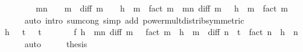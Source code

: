 \begin{isabellebody}
\ \ \isamarkupfalse%
\isanewline
\ \ \ \ \isamarkupfalse%
\ {\isachardoublequoteopen}{\isacharparenleft}{\kern0pt}{\isasymSum}m{\isacharless}{\kern0pt}n{\isachardot}{\kern0pt}\ {\isacharparenleft}{\kern0pt}{\isacharminus}{\kern0pt}\ {}{\isacharparenright}{\kern0pt}\ {\isacharcircum}{\kern0pt}\ m\ {\isacharasterisk}{\kern0pt}\ diff\ m\ {}\ {\isacharasterisk}{\kern0pt}\ {\isacharparenleft}{\kern0pt}{\isacharminus}{\kern0pt}\ h{\isacharparenright}{\kern0pt}\ {\isacharcircum}{\kern0pt}\ m\ {\isacharslash}{\kern0pt}\ fact\ m{\isacharparenright}{\kern0pt}\ {\isacharequal}{\kern0pt}\ {\isacharparenleft}{\kern0pt}{\isasymSum}m{\isacharless}{\kern0pt}n{\isachardot}{\kern0pt}\ diff\ m\ {}\ {\isacharasterisk}{\kern0pt}\ h\ {\isacharcircum}{\kern0pt}\ m\ {\isacharslash}{\kern0pt}\ fact\ m{\isacharparenright}{\kern0pt}{\isachardoublequoteclose}\isanewline
\ \ \ \ \isamarkupfalse%
\ {\isacharparenleft}{\kern0pt}auto\ intro{\isacharcolon}{\kern0pt}\ sum{\isachardot}{\kern0pt}cong\ simp\ add{\isacharcolon}{\kern0pt}\ power{\isacharunderscore}{\kern0pt}mult{\isacharunderscore}{\kern0pt}distrib{\isacharbrackleft}{\kern0pt}symmetric{\isacharbrackright}{\kern0pt}{\isacharparenright}{\kern0pt}\isanewline
\ \ \isamarkupfalse%
\ \isamarkupfalse%
\ {\isachardoublequoteopen}h\ {\isacharless}{\kern0pt}\ {\isacharminus}{\kern0pt}\ t\ {\isasymand}\ {\isacharminus}{\kern0pt}\ t\ {\isacharless}{\kern0pt}\ {}\ {\isasymand}\isanewline
\ \ \ \ f\ h\ {\isacharequal}{\kern0pt}\ {\isacharparenleft}{\kern0pt}{\isasymSum}m{\isacharless}{\kern0pt}n{\isachardot}{\kern0pt}\ diff\ m\ {}\ {\isacharslash}{\kern0pt}\ {\isacharparenleft}{\kern0pt}fact\ m{\isacharparenright}{\kern0pt}\ {\isacharasterisk}{\kern0pt}\ h\ {\isacharcircum}{\kern0pt}\ m{\isacharparenright}{\kern0pt}\ {\isacharplus}{\kern0pt}\ diff\ n\ {\isacharparenleft}{\kern0pt}{\isacharminus}{\kern0pt}\ t{\isacharparenright}{\kern0pt}\ {\isacharslash}{\kern0pt}\ {\isacharparenleft}{\kern0pt}fact\ n{\isacharparenright}{\kern0pt}\ {\isacharasterisk}{\kern0pt}\ h\ {\isacharcircum}{\kern0pt}\ n{\isachardoublequoteclose}\isanewline
\ \ \ \ \isamarkupfalse%
\ auto\isanewline
\ \ \isamarkupfalse%
\ \isamarkupfalse%
\ {\isacharquery}{\kern0pt}thesis\ \isacommand{{\isachardot}{\kern0pt}{\isachardot}{\kern0pt}}\isamarkupfalse%
\isanewline
{}\isamarkupfalse%
%
\endisatagproof
{\isafoldproof}%
%
\isadelimproof
%
\endisadelimproof
%
\isadelimdocument

\end{isabellebody}
